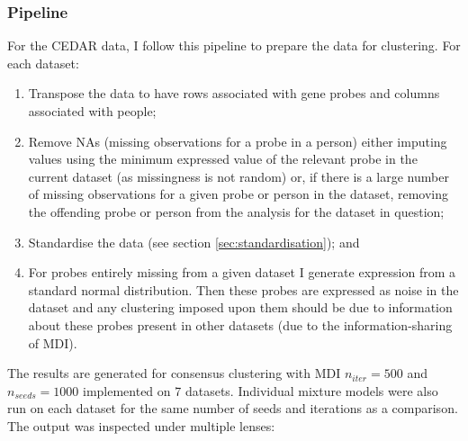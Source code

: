 \documentclass[14pt]{extarticle} %
\begin{document}
 	\subsubsection{Pipeline}
	For the CEDAR data, I follow this pipeline to prepare the data for clustering. For each dataset:
	\begin{enumerate} \label{list:methods}
		\item Transpose the data to have rows associated with gene probes and columns associated with people;
		\item Remove NAs (missing observations for a probe in a person) either imputing values using the minimum expressed value of the relevant probe in the current dataset (as missingness is not random) or, if there is a large number of missing observations for a given probe or person in the dataset, removing the offending probe or person from the analysis for the dataset in question;
		\item Standardise the data (see section \ref{sec:standardisation}); and
		\item For probes entirely missing from a given dataset I generate expression from a standard normal distribution. Then these probes are expressed as noise in the dataset and any clustering imposed upon them should be due to information about these probes present in other datasets (due to the information-sharing of MDI). %
	\end{enumerate}

	The results are generated for consensus clustering with MDI $n_{iter}=500$ and $n_{seeds}=1000$ implemented on 7 datasets. Individual mixture models were also run on each dataset for the same number of seeds and iterations as a comparison. The output was inspected under multiple lenses: 
	
\end{document}
